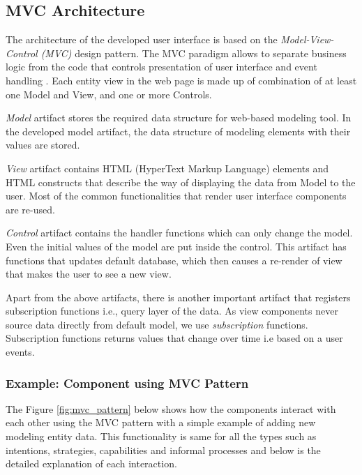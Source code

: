\subsection{MVC Architecture}
\label{subsec:mvcarch}
The architecture of the developed user interface is based on the \textit{Model-View-Control (MVC)} design pattern. The MVC paradigm allows to separate business logic from the code that controls presentation of user interface and event handling \cite{Oracle2016}. Each entity view in the web page is made up of combination of at least one Model and View, and one or more Controls. 

\textit{Model} artifact stores the required data structure for web-based modeling tool. In the developed model artifact, the data structure of modeling elements with their values are stored. 

\textit{View} artifact contains HTML (HyperText Markup Language) elements and HTML constructs that describe the way of displaying the data from Model to the user. Most of the common functionalities that render user interface components are re-used. 

\textit{Control} artifact contains the handler functions which can only change the model. Even the initial values of the model are put inside the control. This artifact has functions that updates default database, which then causes a re-render of view that makes the user to see a new view.

Apart from the above artifacts, there is another important artifact that registers subscription functions i.e., query layer of the data. As view components never source data directly from default model, we use \textit{subscription} functions. Subscription functions returns values that change over time i.e based on a user events.

\subsubsection{Example: Component using MVC Pattern }
The Figure \ref{fig:mvc_pattern} below shows how the components interact with each other using the MVC pattern with a simple example of adding new modeling entity data. This functionality is same for all the types such as intentions, strategies, capabilities and informal processes and below is the detailed explanation of each interaction.

